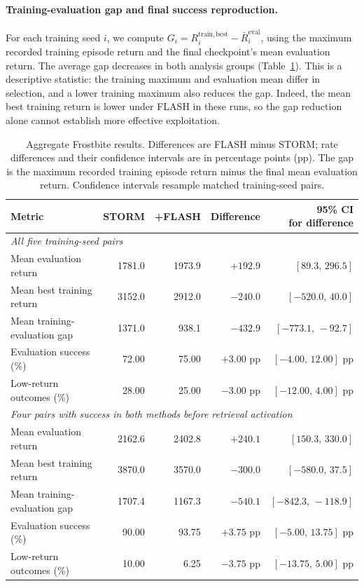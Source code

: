 \documentclass{article} %
\begin{document}
\paragraph{Training-evaluation gap and final success reproduction.}
For each training seed $i$, we compute $G_i = R_i^{\mathrm{train,best}} - \bar{R}_i^{\mathrm{eval}}$, using the maximum recorded training episode return and the final checkpoint's mean evaluation return. The average gap decreases in both analysis groups (Table~\ref{tab:exploitation_aggregate}). This is a descriptive statistic: the training maximum and evaluation mean differ in selection, and a lower training maximum also reduces the gap. Indeed, the mean best training return is lower under FLASH in these runs, so the gap reduction alone cannot establish more effective exploitation.

\begin{table}[!htbp]
\centering
\caption{Aggregate Frostbite results. Differences are FLASH minus STORM; rate differences and their confidence intervals are in percentage points (pp). The gap is the maximum recorded training episode return minus the final mean evaluation return. Confidence intervals resample matched training-seed pairs.}
\label{tab:exploitation_aggregate}
\small
\setlength{\tabcolsep}{4pt}
\renewcommand{\arraystretch}{1.12}
\begin{tabular*}{\textwidth}{@{\extracolsep{\fill}}lrrrr@{}}
\toprule
Metric & STORM & +FLASH & Difference & \shortstack{95\% CI\\for difference} \\
\midrule
\multicolumn{5}{l}{\textit{All five training-seed pairs}} \\
Mean evaluation return & 1781.0 & 1973.9 & $+192.9$ & $[89.3,\,296.5]$ \\
Mean best training return & 3152.0 & 2912.0 & $-240.0$ & $[-520.0,\,40.0]$ \\
Mean training-evaluation gap & 1371.0 & 938.1 & $-432.9$ & $[-773.1,\,-92.7]$ \\
Evaluation success (\%) & 72.00 & 75.00 & $+3.00$ pp & $[-4.00,\,12.00]$ pp \\
Low-return outcomes (\%) & 28.00 & 25.00 & $-3.00$ pp & $[-12.00,\,4.00]$ pp \\
\midrule
\multicolumn{5}{l}{\textit{Four pairs with success in both methods before retrieval activation}} \\
Mean evaluation return & 2162.6 & 2402.8 & $+240.1$ & $[150.3,\,330.0]$ \\
Mean best training return & 3870.0 & 3570.0 & $-300.0$ & $[-580.0,\,37.5]$ \\
Mean training-evaluation gap & 1707.4 & 1167.3 & $-540.1$ & $[-842.3,\,-118.9]$ \\
Evaluation success (\%) & 90.00 & 93.75 & $+3.75$ pp & $[-5.00,\,13.75]$ pp \\
Low-return outcomes (\%) & 10.00 & 6.25 & $-3.75$ pp & $[-13.75,\,5.00]$ pp \\
\bottomrule
\end{tabular*}
\end{table}
\FloatBarrier
\end{document}
